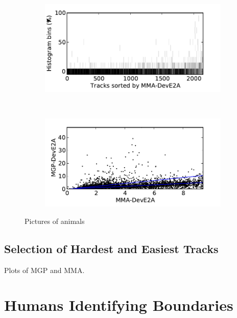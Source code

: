 \documentclass{article}
\begin{document}
\begin{figure}
      \begin{subfigure}[b]{0.25\textwidth}
              \includegraphics[width=\textwidth]{plots/histo-DevE2A.pdf}
              \caption{}
              \label{fig:histo-DevE2A}
      \end{subfigure}%
      ~ 
      \begin{subfigure}[b]{0.25\textwidth}
              \includegraphics[width=\textwidth]{plots/correl-DevE2A.pdf}
              \caption{}
              \label{fig:correl-DevE2A}
      \end{subfigure}

      \caption{Pictures of animals}\label{fig:animals}
\end{figure}

\subsection{Selection of Hardest and Easiest Tracks}

Plots of MGP and MMA.

\section{Humans Identifying Boundaries}\label{sec:using_method}
\end{document}
